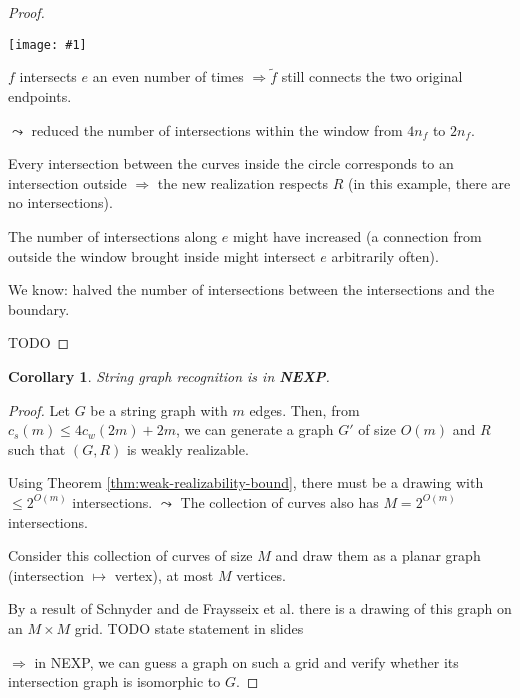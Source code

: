 \documentclass[12pt]{article}
\theoremstyle{plain} %
\newtheorem{corollary}[theorem]{Corollary}
\newcommand{\image}[1]{\begin{center}\texttt{[image: \#1]}\end{center}}
\begin{document}
\begin{proof}
\image{images/figure-9.jpeg}

\(f\) intersects \(e\) an even number of times \(\Rightarrow \tilde{f}\) still connects the two original endpoints.

\(\leadsto\) reduced the number of intersections within the window from \(4 n_f\) 
to \(2 n_f\).

Every intersection between the curves inside the circle corresponds to an intersection 
outside \(\Rightarrow\) the new realization respects \(R\) (in this example, there are no intersections).

The number of intersections along \(e\) might have increased (a connection from outside the window brought inside might intersect \(e\) arbitrarily often).

We know: halved the number of intersections between the intersections and the boundary. 

TODO
\end{proof}

\begin{corollary}
    String graph recognition is in \textbf{NEXP}.
\end{corollary}

\begin{proof}
Let \(G\) be a string graph with \(m\) edges. 
Then, from \(c_s(m) \leq 4 c_w(2m) + 2m\), we can generate a graph \(G'\) of size \(O(m)\) and \(R\) such that 
\((G, R)\) is weakly realizable. 

Using Theorem \ref{thm:weak-realizability-bound}, there must be a drawing with \(\leq 2^{O(m)}\) intersections.
\(\leadsto\) The collection of curves also has \(M = 2^{O(m)}\) intersections.

Consider this collection of curves of size \(M\) and draw them as a planar graph (intersection \(\mapsto\) vertex), 
at most \(M\) vertices.

By a result of Schnyder and de Fraysseix et al. there is a drawing of this graph on an \(M \times M\) grid.
TODO state statement in slides

\(\Rightarrow\) in NEXP, we can guess a graph on such a grid and verify whether its intersection graph is isomorphic to \(G\).
\end{proof}
\end{document}
